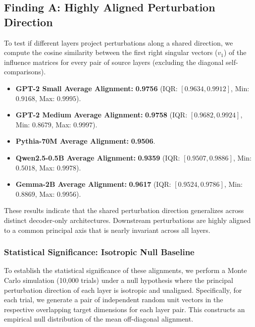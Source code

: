 \documentclass[11pt,a4paper]{article}
\theoremstyle{definition}
\theoremstyle{plain}
\begin{document}
\subsection{Finding A: Highly Aligned Perturbation Direction}
To test if different layers project perturbations along a shared direction, we compute the cosine similarity between the first right singular vectors ($v_1$) of the influence matrices for every pair of source layers (excluding the diagonal self-comparisons).
\begin{itemize}[leftmargin=*]
    \item \textbf{GPT-2 Small Average Alignment:} \textbf{0.9756} (IQR: $[0.9634, 0.9912]$, Min: $0.9168$, Max: $0.9995$).
    \item \textbf{GPT-2 Medium Average Alignment:} \textbf{0.9758} (IQR: $[0.9682, 0.9924]$, Min: $0.8679$, Max: $0.9997$).
    \item \textbf{Pythia-70M Average Alignment:} \textbf{0.9506}.
    \item \textbf{Qwen2.5-0.5B Average Alignment:} \textbf{0.9359} (IQR: $[0.9507, 0.9886]$, Min: $0.5018$, Max: $0.9978$).
    \item \textbf{Gemma-2B Average Alignment:} \textbf{0.9617} (IQR: $[0.9524, 0.9786]$, Min: $0.8869$, Max: $0.9956$).
\end{itemize}
These results indicate that the shared perturbation direction generalizes across distinct decoder-only architectures. Downstream perturbations are highly aligned to a common principal axis that is nearly invariant across all layers.

\subsubsection{Statistical Significance: Isotropic Null Baseline}
To establish the statistical significance of these alignments, we perform a Monte Carlo simulation (10,000 trials) under a null hypothesis where the principal perturbation direction of each layer is isotropic and unaligned. Specifically, for each trial, we generate a pair of independent random unit vectors in the respective overlapping target dimensions for each layer pair. This constructs an empirical null distribution of the mean off-diagonal alignment.
\end{document}
